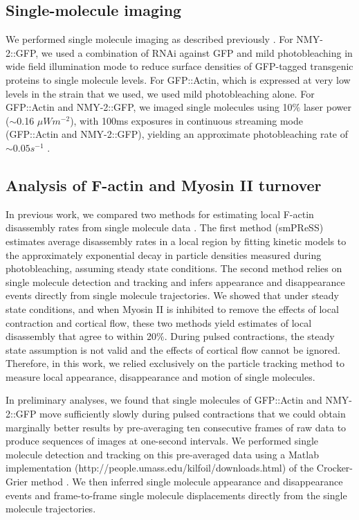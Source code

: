 \subsection{Single-molecule imaging}
We performed single molecule imaging as described previously \cite{Robin:2014jf}. For NMY-2::GFP, we used a combination of RNAi against GFP and mild photobleaching in wide field illumination mode to reduce surface densities of GFP-tagged transgenic proteins to single molecule levels. For GFP::Actin, which is expressed at very low levels in the strain that we used, we used mild photobleaching alone. For GFP::Actin and NMY-2::GFP, we imaged single molecules using 10$\%$ laser power ($\sim$0.16 $\mu Wm^{-2}$), with 100ms exposures in continuous streaming mode (GFP::Actin and NMY-2::GFP), yielding an approximate photobleaching rate of $\sim0.05s^{-1}$ \cite{Robin:2014jf}.


\subsection{Analysis of F-actin and Myosin II turnover}
In previous work, we compared two methods for estimating local F-actin disassembly rates from single molecule data \cite{Robin:2014jf}. The first method (smPReSS) estimates average disassembly rates in a local region by fitting kinetic models to the approximately exponential decay in particle densities measured during photobleaching, assuming steady state conditions.  The second method relies on single molecule detection and tracking and infers appearance and disappearance events directly from single molecule trajectories.  We showed that under steady state conditions, and when Myosin II is inhibited to remove the effects of local contraction and cortical flow, these two methods yield estimates of local disassembly that agree to within 20$\%$.   During pulsed contractions, the steady state assumption is not valid and the  effects of cortical flow cannot be ignored.  Therefore, in this work, we relied exclusively on the particle tracking method to measure local appearance, disappearance and motion of single molecules.

In preliminary analyses, we found that single molecules of GFP::Actin and NMY-2::GFP move sufficiently slowly during pulsed contractions that we could obtain marginally better results by pre-averaging ten consecutive frames of raw data to produce sequences of images at one-second intervals.  We performed single molecule detection and tracking on this pre-averaged data using a Matlab implementation (http://people.umass.edu/kilfoil/downloads.html) of the Crocker-Grier method \cite{Crocker:1996wpa, Pelletier:2009tp}. We then inferred single molecule appearance and disappearance events and frame-to-frame single molecule displacements directly from the single molecule trajectories.




